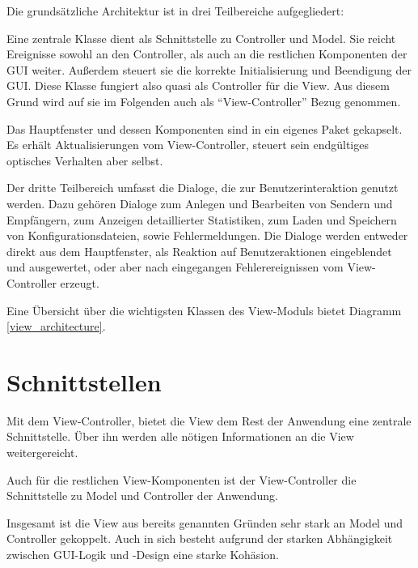         Die grundsätzliche Architektur ist in drei Teilbereiche aufgegliedert:
        
        Eine zentrale Klasse dient als Schnittstelle zu Controller und Model.
        Sie reicht Ereignisse sowohl an den Controller, als auch an die
        restlichen Komponenten der GUI weiter. Außerdem steuert sie die korrekte
        Initialisierung und Beendigung der GUI. Diese Klasse fungiert also quasi
        als Controller für die View. Aus diesem Grund wird auf sie im Folgenden
        auch als "`View-Controller"' Bezug genommen.
        
        Das Hauptfenster und dessen Komponenten sind in ein eigenes Paket
        gekapselt. Es erhält Aktualisierungen vom View-Controller, steuert sein
        endgültiges optisches Verhalten aber selbst.
        
        Der dritte Teilbereich umfasst die Dialoge, die zur Benutzerinteraktion
        genutzt werden. Dazu gehören Dialoge zum Anlegen und Bearbeiten von
        Sendern und Empfängern, zum Anzeigen detaillierter Statistiken, zum
        Laden und Speichern von Konfigurationsdateien, sowie Fehlermeldungen.
        Die Dialoge werden entweder direkt aus dem Hauptfenster, als Reaktion
        auf Benutzeraktionen eingeblendet und ausgewertet, oder aber nach
        eingegangen Fehlerereignissen vom View-Controller erzeugt.
        
        Eine Übersicht über die wichtigsten Klassen des View-Moduls bietet
        Diagramm \ref{view_architecture}.
    
    \section{Schnittstellen}
    
        Mit dem View-Controller, bietet die View dem Rest der Anwendung eine
        zentrale Schnittstelle. Über ihn werden alle nötigen Informationen an
        die View weitergereicht. 
        
        Auch für die restlichen View-Komponenten ist der View-Controller die
        Schnittstelle zu Model und Controller der Anwendung.
        
        Insgesamt ist die View aus bereits genannten Gründen sehr stark an Model
        und Controller gekoppelt. Auch in sich besteht aufgrund der starken
        Abhängigkeit zwischen GUI-Logik und -Design eine starke Kohäsion.




